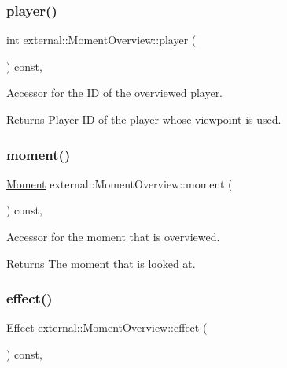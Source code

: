 \subsubsection{\texorpdfstring{player()}{player()}}
{\footnotesize\ttfamily int external\+::\+Moment\+Overview\+::player (\begin{DoxyParamCaption}{ }\end{DoxyParamCaption}) const\hspace{0.3cm}{\ttfamily [inline]}, {\ttfamily [noexcept]}}



Accessor for the ID of the overviewed player. 

\begin{DoxyReturn}{Returns}
Player ID of the player whose viewpoint is used. 
\end{DoxyReturn}
\mbox{\label{classexternal_1_1_moment_overview_a6aaebaf6107f40bfb22a15f82c92e131}} 
\subsubsection{\texorpdfstring{moment()}{moment()}}
{\footnotesize\ttfamily \hyperlink{classtimeplane_1_1_moment}{Moment} external\+::\+Moment\+Overview\+::moment (\begin{DoxyParamCaption}{ }\end{DoxyParamCaption}) const\hspace{0.3cm}{\ttfamily [inline]}, {\ttfamily [noexcept]}}



Accessor for the moment that is overviewed. 

\begin{DoxyReturn}{Returns}
The moment that is looked at. 
\end{DoxyReturn}
\mbox{\label{classexternal_1_1_moment_overview_abeb27fa11c351eea2c90679842895497}} 
\subsubsection{\texorpdfstring{effect()}{effect()}}
{\footnotesize\ttfamily \hyperlink{classitem_1_1_effect}{Effect} external\+::\+Moment\+Overview\+::effect (\begin{DoxyParamCaption}{ }\end{DoxyParamCaption}) const\hspace{0.3cm}{\ttfamily [inline]}, {\ttfamily [noexcept]}}



